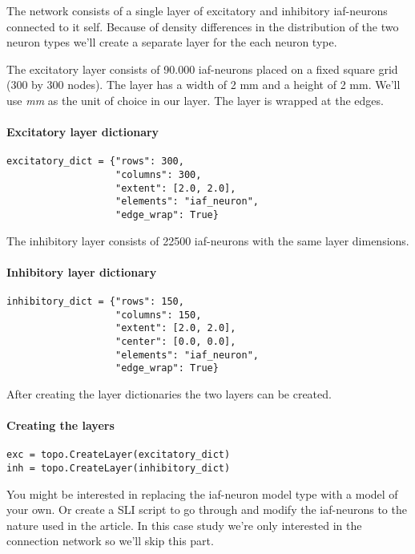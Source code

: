 \documentclass{article}
\begin{document}
The network consists of a single layer of excitatory and inhibitory iaf-neurons connected to it self. Because of density differences in the distribution of the two neuron types we'll create a separate layer for the each neuron type.

The excitatory layer consists of 90.000 iaf-neurons placed on a fixed square grid (300 by 300 nodes). The layer has a width of 2 mm and a height of 2 mm. We'll use \emph{mm} as the unit of choice in our layer. The layer is wrapped at the edges. 

\paragraph{Excitatory layer dictionary}

\begin{verbatim}
excitatory_dict = {"rows": 300,
                   "columns": 300,
                   "extent": [2.0, 2.0],
                   "elements": "iaf_neuron",
                   "edge_wrap": True}
\end{verbatim}

The inhibitory layer consists of 22500 iaf-neurons with the same layer dimensions.

\paragraph{Inhibitory layer dictionary}

\begin{verbatim}
inhibitory_dict = {"rows": 150,
                   "columns": 150,
                   "extent": [2.0, 2.0],
                   "center": [0.0, 0.0],
                   "elements": "iaf_neuron",
                   "edge_wrap": True}
\end{verbatim}

After creating the layer dictionaries the two layers can be created. 

\paragraph{Creating the layers}

\begin{verbatim}
exc = topo.CreateLayer(excitatory_dict)
inh = topo.CreateLayer(inhibitory_dict)
\end{verbatim}

You might be interested in replacing the iaf-neuron model type with a model of your own. Or create a SLI script to go through and modify the iaf-neurons to the nature used in the article. In this case study we're only interested in the connection network so we'll skip this part. 
\end{document}
